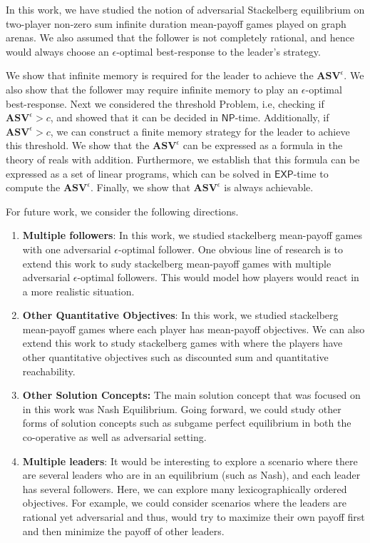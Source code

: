 In this work, we have studied the notion of adversarial Stackelberg equilibrium on two-player non-zero sum infinite duration mean-payoff games played on graph arenas. We also assumed that the follower is not completely rational, and hence would always choose an $\epsilon$-optimal best-response to the leader's strategy.

We show that infinite memory is required for the leader to achieve the $\mathbf{ASV}^{\epsilon}$. We also show that the follower may require infinite memory to play an $\epsilon$-optimal best-response. 
Next we considered the threshold Problem, i.e, checking if $\mathbf{ASV}^{\epsilon} > c$, and showed that it can be decided in $\mathsf{NP}$-time. Additionally, if $\mathbf{ASV}^{\epsilon} > c$, we can construct a finite memory strategy for the leader to achieve this threshold. We show that the $\mathbf{ASV}^{\epsilon}$ can be expressed as a formula in the theory of reals with addition. Furthermore, we establish that this formula can be expressed as a set of linear programs, which can be solved in $\mathsf{EXP}$-time to compute the $\mathbf{ASV}^{\epsilon}$. Finally, we show that $\mathbf{ASV}^{\epsilon}$ is always achievable.

For future work, we consider the following directions.
\begin{enumerate}
    \item \textbf{Multiple followers}: In this work, we studied stackelberg mean-payoff games with one adversarial $\epsilon$-optimal follower. One obvious line of research is to extend this work to sudy stackelberg mean-payoff games with multiple adversarial $\epsilon$-optimal followers. This would model how players would react in a more realistic situation.
    \item \textbf{Other Quantitative Objectives}: In this work, we studied stackelberg mean-payoff games where  each player has mean-payoff objectives. We can also extend this work to study stackelberg games with where the players have other quantitative objectives such as discounted sum and quantitative reachability.
    \item \textbf{Other Solution Concepts:} The main solution concept that was focused on in this work was Nash Equilibrium. Going forward, we could study other forms of solution concepts such as subgame perfect equilibrium in both the co-operative as well as adversarial setting.
    \item \textbf{Multiple leaders}: It would be interesting to explore a scenario where there are several leaders who are in an equilibrium (such as Nash), and each leader has several followers. Here, we can explore many lexicographically ordered objectives. For example, we could consider scenarios where the leaders are rational yet adversarial and thus, would try to maximize their own payoff first and then minimize the payoff of other leaders. 
\end{enumerate}